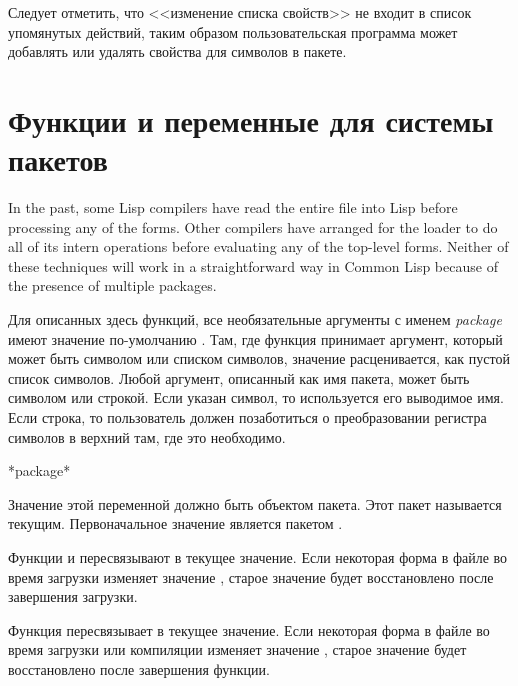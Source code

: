 Следует отметить, что <<изменение списка свойств>> не входит в список упомянутых
действий, таким образом пользовательская программа может добавлять или удалять
свойства для символов в  пакете.

\section{Функции и переменные для системы пакетов}
\label{PACKAGE-FUNCTIONS-SECTION}

\beforenoterule
\begin{implementation}
In the past, some Lisp compilers have read
the entire file into Lisp before processing any of the forms.  
Other compilers have arranged for
the loader to do all of its intern operations before evaluating any of the
top-level forms.  Neither of these techniques will work in a
straightforward way in Common Lisp because of the presence of multiple
packages.
\end{implementation}
\afternoterule

Для описанных здесь функций, все необязательные аргументы с именем
\emph{package} имеют значение по-умолчанию . Там, где функция
принимает аргумент, который может быть символом или списком символов, значение
{\false} расценивается, как пустой список символов. Любой аргумент, описанный
как имя пакета, может быть символом или строкой.
Если указан символ, то используется его выводимое имя. Если строка, то
пользователь должен позаботиться о преобразовании регистра символов в верхний
там, где это необходимо.

\begin{defun}[Переменная]
*package*

Значение этой переменной должно быть объектом пакета. Этот пакет называется
текущим. Первоначальное значение  является пакетом .

Функции  и  пересвязывают  в текущее значение. Если
некоторая форма в файле во время загрузки изменяет значение ,
старое значение будет восстановлено после завершения загрузки.

Функция  пересвязывает  в текущее
значение. Если некоторая форма в файле во время загрузки или компиляции изменяет
значение , старое значение будет восстановлено после завершения функции.
\end{defun}

